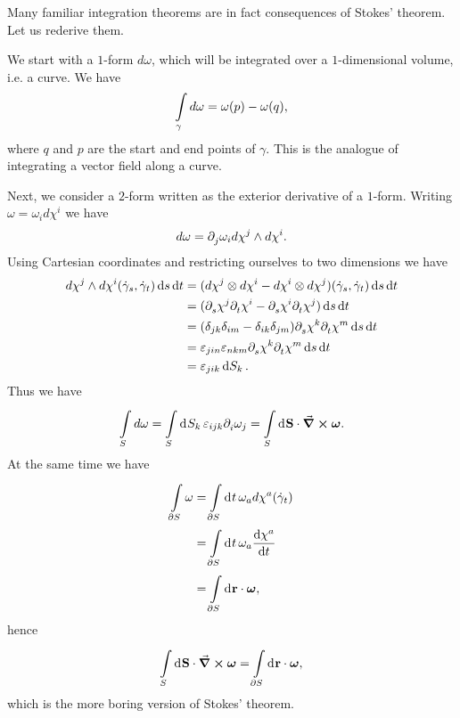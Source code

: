 Many familiar integration theorems are in fact consequences of Stokes' theorem. Let us rederive them.

We start with a $1$-form $d\omega$, which will be integrated over a $1$-dimensional volume, i.e. a curve. We have
\begin{align*}
	\int\limits_{\gamma}d\omega = \omega(p) - \omega(q),
\end{align*}
where $q$ and $p$ are the start and end points of $\gamma$. This is the analogue of integrating a vector field along a curve.

Next, we consider a $2$-form written as the exterior derivative of a $1$-form. Writing $\omega = \omega_{i}d\chi^{i}$ we have
\begin{align*}
	d\omega = \partial^{}_{j}\omega_{i}d\chi^{j}\wedge d\chi^{i}.
\end{align*}
Using Cartesian coordinates and restricting ourselves to two dimensions we have
\begin{align*}
	d\chi^{j}\wedge d\chi^{i}(\dot{\gamma}_{s}, \dot{\gamma}_{t})\dd{s}\dd{t} &= (d\chi^{j}\otimes d\chi^{i} - d\chi^{i}\otimes d\chi^{j})(\dot{\gamma}_{s}, \dot{\gamma}_{t})\dd{s}\dd{t} \\
	&= (\partial^{}_{s}\chi^{j}\partial^{}_{t}\chi^{i} - \partial^{}_{s}\chi^{i}\partial^{}_{t}\chi^{j})\dd{s}\dd{t} \\
	&= (\delta_{jk}\delta_{im} - \delta_{ik}\delta_{jm})\partial^{}_{s}\chi^{k}\partial^{}_{t}\chi^{m}\dd{s}\dd{t} \\
	&= \varepsilon_{jin}\varepsilon_{nkm}\partial^{}_{s}\chi^{k}\partial^{}_{t}\chi^{m}\dd{s}\dd{t} \\
	&= \varepsilon_{jik}\dd{S_{k}}.
\end{align*}
Thus we have
\begin{align*}
	\int\limits_{S}d\omega = \int\limits_{S}^{}\dd[]{S_{k}}\varepsilon_{ijk}\partial^{}_{i}\omega_{j} = \int\limits_{S}^{}\dd[]{\vb{S}}\cdot\curl{\vb*{\omega}}.
\end{align*}
At the same time we have
\begin{align*}
	\int\limits_{\partial S}\omega &= \int\limits_{\partial S}^{}\dd[]{t}\omega_{a}d\chi^{a}(\dot{\gamma}_{t}) \\
	                           &= \int\limits_{\partial S}^{}\dd[]{t}\omega_{a}\dv{\chi^{a}}{t} \\
	                           &= \int\limits_{\partial S}^{}\dd[]{\vb{r}}\cdot\vb*{\omega},
\end{align*}
hence
\begin{align*}
	\int\limits_{S}^{}\dd[]{\vb{S}}\cdot\curl{\vb*{\omega}} = \int\limits_{\partial S}^{}\dd[]{\vb{r}}\cdot\vb*{\omega},
\end{align*}
which is the more boring version of Stokes' theorem.

